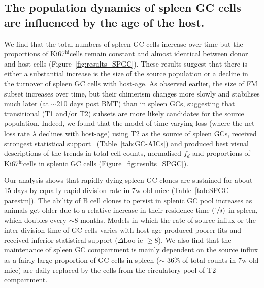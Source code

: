 \documentclass[11pt]{article}
\newcommand{\khi}{Ki67$^\text{hi}$}
\begin{document}
	\subsection*{The population dynamics of spleen GC cells are influenced by the age of the host.}
	We find that the total numbers of spleen GC cells increase over time but the proportions of \khi cells remain constant and almost identical between donor and host cells (Figure~\ref{fig:results_SPGC}).
	These results suggest that there is either a substantial increase is the size of the source population or a decline in the turnover of spleen GC cells with host-age.  
	As observed earlier, the size of FM subset increases over time, but their chimerism changes more slowly and stabilises much later (at $\sim$210 days post BMT) than in spleen GCs, suggesting that transitional (T1 and/or T2) subsets are more likely candidates for the source population. 
	Indeed, we found that the model of time-varying loss (where the net loss rate $\lambda$ declines with host-age) using T2 as the source of spleen GCs, received strongest statistical support ~(Table~\ref{tab:GC-AICs}) and produced best visual descriptions of the trends in total cell counts, normalised $f_{d}$ and proportions of \khi cells in splenic GC cells (Figure~\ref{fig:results_SPGC}). 
	
	Our analysis shows that rapidly dying spleen GC clones are sustained for about 15 days by equally rapid division rate in 7w old mice (Table~\ref{tab:SPGC-parestm}).
	The ability of B cell clones to persist in splenic GC pool increases as animals get older due to a relative increase in their residence time $(\nicefrac{1}{\delta})$ in spleen, which doubles every $\sim$8 months.
	Models in which the rate of source influx or the inter-division time of GC cells varies with host-age produced poorer fits and received inferior statistical support  ($\Delta$Loo-ic $\ge 8$).  
	We also find that the maintenance of spleen GC compartment is mainly dependent on the source influx as a fairly large proportion of GC cells in spleen ($\sim$ 36\% of total counts in 7w old mice) are daily replaced by the cells from the circulatory pool of T2 compartment. 
	
\end{document}
